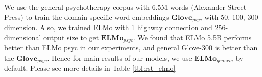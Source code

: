 We use the general psychotherapy corpus with 6.5M words (Alexander
Street Press) to train the domain specific  word embeddings
$\textbf{Glove}_{psyc}$ with 50, 100, 300 dimension. Also, we
trained ELMo with 1 highway connection and 256-dimensional output size to get $\textbf{ELMo}_{psyc}$. We found that ELMo 5.5B performs better than ELMo psyc in our experiments, and general Glove-300 is better than the $\textbf{Glove}_{psyc}$. Hence for main results of our models, we use $\textbf{ELMo}_{generic}$ by default.
Please see more details in Table \ref{tbl:rst_elmo}

